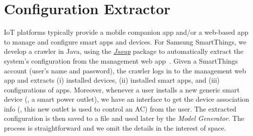 \chapter{Configuration Extractor}
\label{sec:extractor}

IoT platforms typically provide a mobile companion app and/or a web-based app
to manage and configure smart apps and devices.
For Samsung SmartThings, we develop a crawler in Java,
using the \href{https://jsoup.org/}{\textit{Jsoup}} package to automatically extract the system's
configuration from the management web app~\cite{Samsung:smartthingsmanage}.
Given a SmartThings account (user's name and password),
the crawler logs in to the management web app
and extracts (i) installed devices, (ii) installed smart apps, and
(iii) configurations of apps.
Moreover, whenever a user installs a new generic smart device (\eg, a smart power outlet),
we have an interface to get the device association info (\eg, this new outlet is used to control an AC) from the user.
The extracted configuration is then saved to a file and used later by the \textit{Model Generator}.
The process is straightforward and we omit the details in the interest of space.
